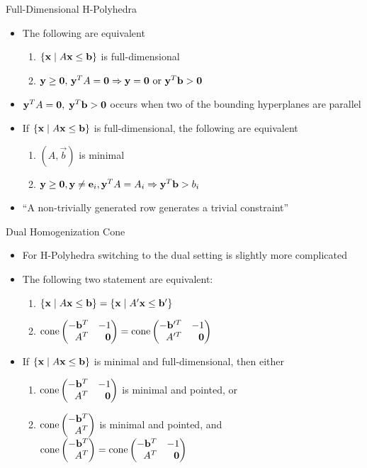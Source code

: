 \documentclass{beamer}
\begin{document}
\begin{frame}{Full-Dimensional H-Polyhedra}
\begin{itemize}
  \item<1-> The following are equivalent
  \begin{enumerate}
    \item $\left\{\mathbf{x}\;|\; A\mathbf{x}\leq \mathbf{b}\right\}$ is full-dimensional
    \item $ \mathbf{y}\geq\mathbf{0},\, \mathbf{y}^T A = \mathbf{0} \Rightarrow 
      \mathbf{y} = \mathbf{0} \text{ or } \mathbf{y}^T \mathbf{b} > \mathbf{0} $
  \end{enumerate}
  \item<2-> $\mathbf{y}^T A = \mathbf{0},\;\mathbf{y}^T \mathbf{b} > \mathbf{0}$ occurs when two of the bounding hyperplanes are parallel
  \item<3-> If $\left\{\mathbf{x}\;|\; A\mathbf{x}\leq \mathbf{b}\right\}$ is full-dimensional, the following are equivalent
  \begin{enumerate}
    \item $(A,\vec{b})$ is minimal
    \item $\mathbf{y}\geq\mathbf{0},\mathbf{y}\neq\mathbf{e}_i, \mathbf{y}^T A = A_i \Rightarrow \mathbf{y}^T\mathbf{b} > b_i$
  \end{enumerate}
  \item<4-> ``A non-trivially generated row generates a trivial constraint''
\end{itemize}
\end{frame}

\begin{frame}{Dual Homogenization Cone}
\begin{itemize}
  \item<1-> For H-Polyhedra switching to the dual setting is slightly more complicated
  \item<2-> 	The following two statement are equivalent:
    \begin{enumerate}
      \item $\left\{\mathbf{x}\;|\; A\mathbf{x}\leq \mathbf{b}\right\} = \left\{\mathbf{x}\;|\; A'\mathbf{x}\leq \mathbf{b}'\right\}$
      \item $\cone \pmb -\vec{b}^T & -1 \\ A^T & \0 \pme = \cone \pmb -\vec{b}'^T & -1 \\ A'^T & \0 \pme$
    \end{enumerate}
  \item<3-> If $\left\{\mathbf{x}\;|\; A\mathbf{x}\leq \mathbf{b}\right\}$ is minimal and full-dimensional, then either 
    \begin{enumerate}
      \item $\cone \pmb -\vec{b}^T & -1 \\ A^T & \0 \pme$ is minimal and pointed, or
      \item $\cone \pmb -\vec{b}^T \\ A^T \pme$ is minimal and pointed, and $\cone\pmb -\vec{b}^T \\ A^T \pme = \cone \pmb -\vec{b}^T & -1 \\ A^T & \0 \pme$
    \end{enumerate}
\end{itemize}
\end{frame}
\end{document}
